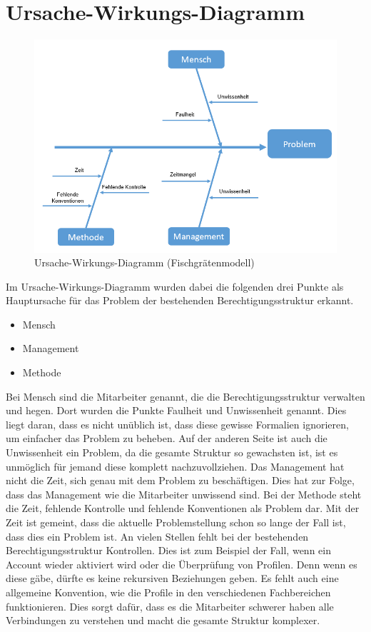 \section{Ursache-Wirkungs-Diagramm}
\label{sec:intro:UWD}
\begin{figure}[h!]
 \centering
 \includegraphics[width=1\textwidth]{gfx/Picture/Fisch.PNG}
 \caption{Ursache-Wirkungs-Diagramm (Fischgrätenmodell)}
 \label{fig:Fisch}
\end{figure}
Im Ursache-Wirkungs-Diagramm wurden dabei die folgenden drei Punkte als Hauptursache für das Problem der bestehenden Berechtigungsstruktur erkannt.
\begin{itemize}
	\item Mensch
	\item Management
	\item Methode
\end{itemize}
Bei Mensch sind die Mitarbeiter genannt, die die Berechtigungsstruktur verwalten und hegen.
Dort wurden die Punkte Faulheit und Unwissenheit genannt.
Dies liegt daran, dass es nicht unüblich ist, dass diese gewisse Formalien ignorieren, um einfacher das Problem zu beheben.
Auf der anderen Seite ist auch die Unwissenheit ein Problem, da die gesamte Struktur so gewachsten ist, ist es unmöglich für jemand diese komplett nachzuvollziehen.
\newline
Das Management hat nicht die Zeit, sich genau mit dem Problem zu beschäftigen.
Dies hat zur Folge, dass das Management wie die Mitarbeiter unwissend sind.
\newline
Bei der Methode steht die Zeit, fehlende Kontrolle und fehlende Konventionen als Problem dar.
Mit der Zeit ist gemeint, dass die aktuelle Problemstellung schon so lange der Fall ist, dass dies ein Problem ist.
An vielen Stellen fehlt bei der bestehenden Berechtigungsstruktur Kontrollen.
Dies ist zum Beispiel der Fall, wenn ein Account wieder aktiviert wird oder die Überprüfung von Profilen.
Denn wenn es diese gäbe, dürfte es keine rekursiven Beziehungen geben.
Es fehlt auch eine allgemeine Konvention, wie die Profile in den verschiedenen Fachbereichen funktionieren.
Dies sorgt dafür, dass es die Mitarbeiter schwerer haben alle Verbindungen zu verstehen und macht die gesamte Struktur komplexer.